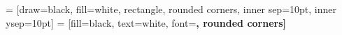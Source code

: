 \newcommand{\createbox}[2]{
    \begin{tikzpicture}
    \node [mybox, align=left, text width=\textwidth-20pt] (box){%
        #2
    };
    \node[fancytitle, right=10pt] at (box.north west) {#1};
    \end{tikzpicture}
    \vspace{-0.35cm}
}

 = [draw=black, fill=white,
    rectangle, rounded corners, inner sep=10pt, inner ysep=10pt]
 = [fill=black, text=white, font=\bfseries, rounded corners]


\newcommand{\ejemplo}[1]{\createbox{Ejemplo}{#1}}


\usepackage{hyperref}

